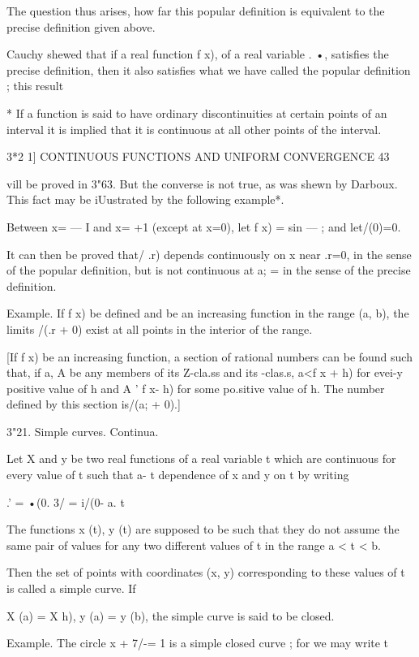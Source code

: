 The question thus arises, how far this popular definition is
equivalent to the precise definition given above.

Cauchy shewed that if a real function f x), of a real variable . •,
satisfies the precise definition, then it also satisfies what we have
called the popular definition ; this result

* If a function is said to have ordinary discontinuities at certain
points of an interval it is implied that it is continuous at all other
points of the interval.



3*2 1] CONTINUOUS FUNCTIONS AND UNIFORM CONVERGENCE 43

vill be proved in 3"63. But the converse is not true, as was shewn by
Darboux. This fact may be iUustrated by the following example*.

Between x= — I and x= +1 (except at x=0), let f x) = sin — ; and
let/(0)=0.

It can then be proved that/ .r) depends continuously on x near .r=0,
in the sense of the popular definition, but is not continuous at a; =
in the sense of the precise definition.

Example. If f x) be defined and be an increasing function in the range
(a, b), the limits /(.r + 0) exist at all points in the interior of
the range.

[If f x) be an increasing function, a section of rational numbers can
be found such that, if a, A be any members of its Z-cla.ss and its
-clas.s, a<f x + h) for evei-y positive value of h and A ' f x- h) for
some po.sitive value of h. The number defined by this section is/(a; +
0).]

3"21. Simple curves. Continua.

Let X and y be two real functions of a real variable t which are
continuous for every value of t such that a- t %
dependence of x and y on t by writing

.' = •(0. 3/ = i/(0- a. t%

The functions x (t), y (t) are supposed to be such that they do not
assume the same pair of values for any two different values of t in
the range a < t < b.

Then the set of points with coordinates (x, y) corresponding to these
values of t is called a simple curve. If

X (a) = X h), y (a) = y (b), the simple curve is said to be closed.

Example. The circle x + 7/-= 1 is a simple closed curve ; for we may
write t


